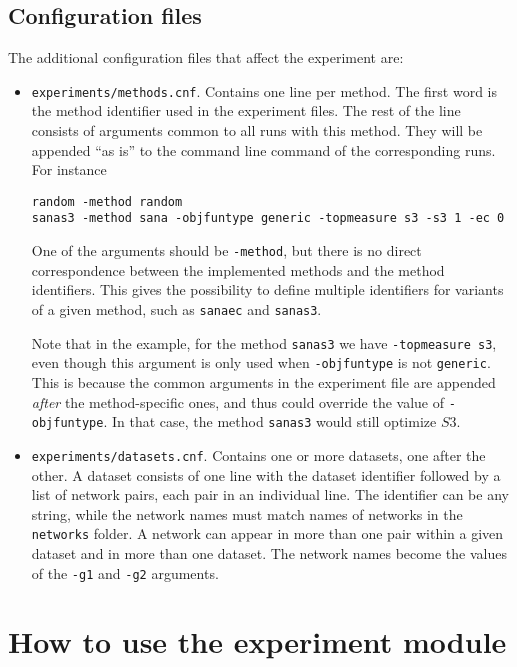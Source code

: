\documentclass[]{article}
\begin{document}
\subsection{Configuration files}\label{conf}
The additional configuration files that affect the experiment are:
\begin{itemize}
\item \verb|experiments/methods.cnf|. Contains one line per method. The first word is the method identifier used in the experiment files. The rest of the line consists of arguments common to all runs with this method. They will be appended ``as is'' to the command line command of the corresponding runs. For instance
\begin{verbatim}
random -method random
sanas3 -method sana -objfuntype generic -topmeasure s3 -s3 1 -ec 0
\end{verbatim}
One of the arguments should be \verb|-method|, but there is no direct correspondence between the implemented methods and the method identifiers. This gives the possibility to define multiple identifiers for variants of a given method, such as \verb|sanaec| and \verb|sanas3|. 

Note that in the example, for the method \verb|sanas3| we have \verb|-topmeasure s3|, even though this argument is only used when \verb|-objfuntype| is not \verb|generic|. This is because the common arguments in the experiment file are appended \textit{after} the method-specific ones, and thus could override the value of \verb|-objfuntype|. In that case, the method \verb|sanas3| would still optimize $S3$.

\item \verb|experiments/datasets.cnf|. Contains one or more datasets, one after the other. A dataset consists of one line with the dataset identifier followed by a list of network pairs, each pair in an individual line. The identifier can be any string, while the network names must match names of networks in the \verb|networks| folder. A network can appear in more than one pair within a given dataset and in more than one dataset. The network names become the values of the \verb|-g1| and \verb|-g2| arguments.
\end{itemize}

\section{How to use the experiment module}
\end{document}
